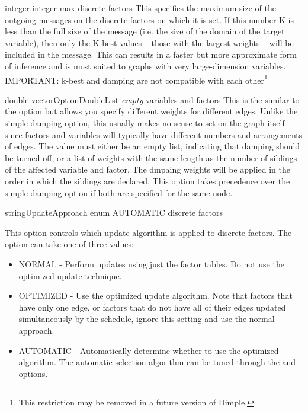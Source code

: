 
{integer}
{integer max}
{discrete factors}
{This specifies the maximum size of the outgoing messages on the discrete factors on which it is set. If this number K is less than the full size of the message (i.e. the size of the domain of the target variable), then only the K-best values -- those with the largest weights -- will be included in the message. This can results in a faster but more approximate form of inference and is most suited to graphs with very large-dimension variables.
\linebreak
\linebreak
IMPORTANT: k-best and damping are not compatible with each other\footnote{This restriction may be removed in a future version of Dimple.}}


{\ifmatlab double vector\fi \ifjava OptionDoubleList\fi}
{\textit{empty}}
{variables and factors}
{This is the similar to the  option but allows you specify different weights for different edges. Unlike the simple damping option, this usually makes no sense to set on the graph itself since factors and variables will typically have different numbers and arrangements of edges. The value must either be an empty list, indicating that damping should be turned off, or a list of weights with the same length as the number of siblings of the affected variable and factor. The dmpaing weights will be applied in the order in which the siblings are declared.
\linebreak
\linebreak
This option takes precedence over the simple damping option if both are specified for the same node.
}


{\ifmatlab string\fi \ifjava UpdateApproach enum\fi}
{AUTOMATIC}
{discrete factors}
{This option controls which update algorithm is applied to discrete factors. The option can take one of three values:
\begin{itemize}
\item NORMAL - Perform updates using just the factor tables. Do not use the optimized update technique.
\item OPTIMIZED - Use the optimized update algorithm. Note that factors that have only one edge, or factors that do not have all of their edges updated simultaneously by the schedule, ignore this setting and use the normal approach.
\item AUTOMATIC - Automatically determine whether to use the optimized algorithm. The automatic selection algorithm can be tuned through the  and  options.
\end{itemize}
}

